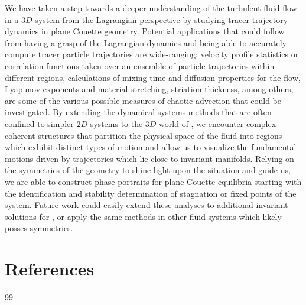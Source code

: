 \documentclass[lineno]{jfm}
\begin{document}
We have taken a step towards a deeper understanding of the  turbulent 
fluid flow in a $3D$ system from the Lagrangian perspective by studying 
tracer trajectory dynamics in plane Couette geometry. Potential 
applications that could follow from having a grasp of the Lagrangian 
dynamics and being able to accurately compute tracer particle 
trajectories are wide-ranging: velocity profile statistics or correlation 
functions taken over an ensemble of particle trajectories within 
different regions, calculations of mixing time and diffusion properties 
for the flow, Lyapunov exponents and material stretching, striation 
thickness, among others, are some of the various possible measures of 
chaotic advection that could be investigated. By extending the dynamical 
systems methods that are often confined to simpler $2D$ systems to the 
$3D$ world of {\pCf}, we encounter complex coherent structures that 
partition the physical space of the fluid into regions which exhibit 
distinct types of motion and allow us to visualize the fundamental 
motions driven by trajectories which lie close to invariant manifolds. 
Relying on the symmetries of the geometry to shine light upon the 
situation and guide us, we are able to construct phase portraits for 
plane Couette equilibria starting with the identification and stability 
determination of stagnation or fixed points of the system. Future work 
could easily extend these analyses to additional invariant solutions for 
{\pCf}, or apply the same methods in other fluid systems which likely 
posses symmetries. 

\fi %

    \ifsubmission
\section*{References}
{99} %
    \else
\printbibliography[
heading=bibintoc,
title={References}
				  ] %
    \fi
\end{document}
